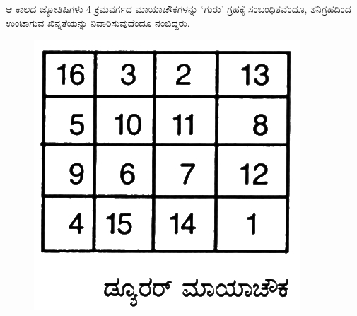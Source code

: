ಆ ಕಾಲದ ಜ್ಯೋತಿಷಿಗಳು 4 ಕ್ರಮವರ್ಗದ ಮಾಯಾಚೌಕಗಳನ್ನು ‘ಗುರು’ ಗ್ರಹಕ್ಕೆ ಸಂಬಂಧಿತವೆಂದೂ, ಶನಿಗ್ರಹದಿಂದ ಉಂಟಾಗುವ ಖಿನ್ನತೆಯನ್ನು ನಿವಾರಿಸುವುದೆಂದೂ ನಂಬಿದ್ದರು.
\begin{figure}[H]
\includegraphics{src/figures/chap4/fig4-15.jpg}
\end{figure}
